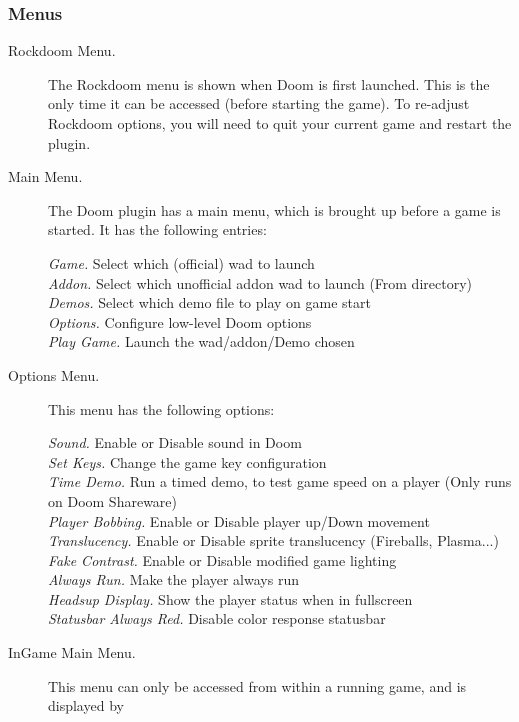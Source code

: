 \subsubsection{Menus}
\begin{description}
  \item[Rockdoom Menu. ] The Rockdoom menu is shown when Doom is first launched.  
This is the only time it can be accessed (before starting the game).  To re-adjust 
Rockdoom options, you will need to quit your current game and restart the plugin.
  \item[Main Menu. ]
  The Doom plugin has a main menu, which is brought up before a game is started. It 
  has the following entries:
  
  \emph{Game. } Select which (official) wad to launch\\
  \emph{Addon. } Select which unofficial addon wad to launch (From 
   directory)\\
  \emph{Demos. } Select which demo file to play on game start\\
  \emph{Options. } Configure low-level Doom options\\
  \emph{Play Game. } Launch the wad/addon/Demo chosen%
  
  \item[Options Menu. ]This menu has the following options:
  
  \emph{Sound. } Enable or Disable sound in Doom\\
  \emph{Set Keys. }  Change the game key configuration\\
  \emph{Time Demo. } Run a timed demo, to test game speed on a player (Only runs on Doom Shareware)\\
  \emph{Player Bobbing. } Enable or Disable player up/Down movement\\
  \emph{Translucency. } Enable or Disable sprite translucency (Fireballs, Plasma...)\\
  \emph{Fake Contrast.} Enable or Disable modified game lighting\\
  \emph{Always Run.} Make the player always run\\
  \emph{Headsup Display.} Show the player status when in fullscreen\\
  \emph{Statusbar Always Red.} Disable color response statusbar%

  \item[InGame Main Menu. ]This menu can only be accessed from within a running game, and is displayed by


\end{description}

